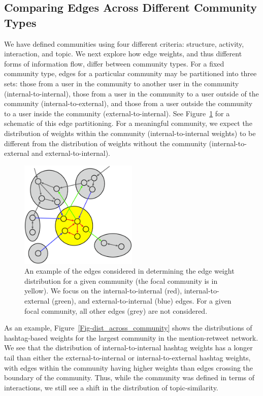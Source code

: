 \subsection{Comparing Edges Across Different Community Types}

We have defined communities using four different criteria: structure, activity, interaction, and topic. We next explore how edge weights, and thus different forms of information flow, differ between community types. For a fixed community type, edges for a particular community may be partitioned into three sets: those from a user in the community to another user in the community (internal-to-internal), those from a user in the community to a user outside of the community (internal-to-external), and those from a user outside the community to a user inside the community (external-to-internal). See Figure~\ref{Fig-edge_types} for a schematic of this edge partitioning. For a meaningful community, we expect the distribution of weights within the community (internal-to-internal weights) to be different from the distribution of weights without the community (internal-to-external and external-to-internal).

\begin{figure}[ht]
  \centering
\includegraphics[width=0.50\textwidth]{figures/edge-types.eps}
\caption{An example of the edges considered in determining the edge weight distribution for a given community (the focal community is in yellow). We focus on the internal-to-internal (red), internal-to-external (green), and external-to-internal (blue) edges. For a given focal community, all other edges (grey) are not considered.}
\label{Fig-edge_types}
\end{figure}

As an example, Figure~\ref{Fig-dist_across_community} shows the distributions of hashtag-based weights for the largest community in the mention-retweet network. We see that the distribution of internal-to-internal hashtag weights has a longer tail than either the external-to-internal or internal-to-external hashtag weights, with edges within the community having higher weights than edges crossing the boundary of the community. Thus, while the community was defined in terms of interactions, we still see a shift in the distribution of topic-similarity.

